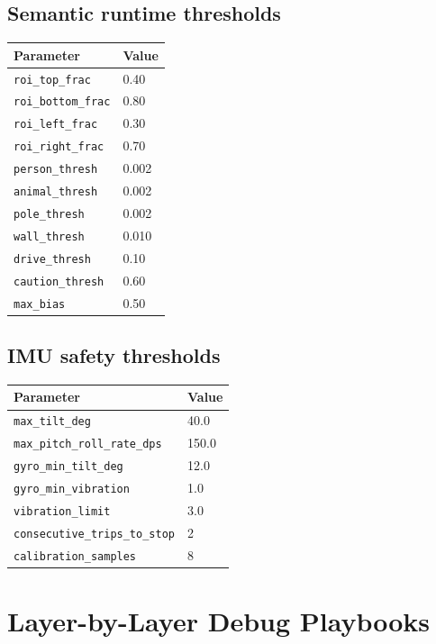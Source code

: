 \documentclass[11pt]{article}
\begin{document}
\subsection{Semantic runtime thresholds}

\begin{center}
\begin{tabular}{ll}
\toprule
\textbf{Parameter} & \textbf{Value} \\
\midrule
\texttt{roi\_top\_frac} & 0.40 \\
\texttt{roi\_bottom\_frac} & 0.80 \\
\texttt{roi\_left\_frac} & 0.30 \\
\texttt{roi\_right\_frac} & 0.70 \\
\texttt{person\_thresh} & 0.002 \\
\texttt{animal\_thresh} & 0.002 \\
\texttt{pole\_thresh} & 0.002 \\
\texttt{wall\_thresh} & 0.010 \\
\texttt{drive\_thresh} & 0.10 \\
\texttt{caution\_thresh} & 0.60 \\
\texttt{max\_bias} & 0.50 \\
\bottomrule
\end{tabular}
\end{center}

\subsection{IMU safety thresholds}

\begin{center}
\begin{tabular}{ll}
\toprule
\textbf{Parameter} & \textbf{Value} \\
\midrule
\texttt{max\_tilt\_deg} & 40.0 \\
\texttt{max\_pitch\_roll\_rate\_dps} & 150.0 \\
\texttt{gyro\_min\_tilt\_deg} & 12.0 \\
\texttt{gyro\_min\_vibration} & 1.0 \\
\texttt{vibration\_limit} & 3.0 \\
\texttt{consecutive\_trips\_to\_stop} & 2 \\
\texttt{calibration\_samples} & 8 \\
\bottomrule
\end{tabular}
\end{center}

\section{Layer-by-Layer Debug Playbooks}
\end{document}
